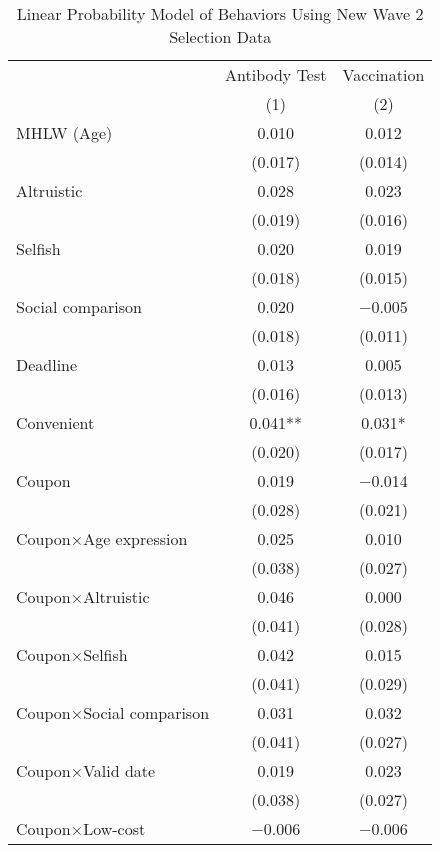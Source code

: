 \begin{table}

\caption{Linear Probability Model of Behaviors Using New Wave 2 Selection Data \label{tab:act2-reg}}
\centering
\fontsize{9}{11}\selectfont
\begin{threeparttable}
\begin{tabular}[t]{lcc}
\toprule
\multicolumn{1}{c}{ } & \multicolumn{1}{c}{Antibody Test} & \multicolumn{1}{c}{Vaccination} \\
\cmidrule(l{3pt}r{3pt}){2-2} \cmidrule(l{3pt}r{3pt}){3-3}
  & (1) & (2)\\
\midrule
MHLW (Age) & \num{0.010} & \num{0.012}\\
 & (\num{0.017}) & (\num{0.014})\\
Altruistic & \num{0.028} & \num{0.023}\\
 & (\num{0.019}) & (\num{0.016})\\
Selfish & \num{0.020} & \num{0.019}\\
 & (\num{0.018}) & (\num{0.015})\\
Social comparison & \num{0.020} & \num{-0.005}\\
 & (\num{0.018}) & (\num{0.011})\\
Deadline & \num{0.013} & \num{0.005}\\
 & (\num{0.016}) & (\num{0.013})\\
Convenient & \num{0.041}** & \num{0.031}*\\
 & (\num{0.020}) & (\num{0.017})\\
Coupon & \num{0.019} & \num{-0.014}\\
 & (\num{0.028}) & (\num{0.021})\\
Coupon×Age expression & \num{0.025} & \num{0.010}\\
 & (\num{0.038}) & \vphantom{1} (\num{0.027})\\
Coupon×Altruistic & \num{0.046} & \num{0.000}\\
 & (\num{0.041}) & (\num{0.028})\\
Coupon×Selfish & \num{0.042} & \num{0.015}\\
 & (\num{0.041}) & (\num{0.029})\\
Coupon×Social comparison & \num{0.031} & \num{0.032}\\
 & (\num{0.041}) & (\num{0.027})\\
Coupon×Valid date & \num{0.019} & \num{0.023}\\
 & (\num{0.038}) & (\num{0.027})\\
Coupon×Low-cost & \num{-0.006} & \num{-0.006}\\

\end{tabular}
\end{threeparttable}
\end{table}
